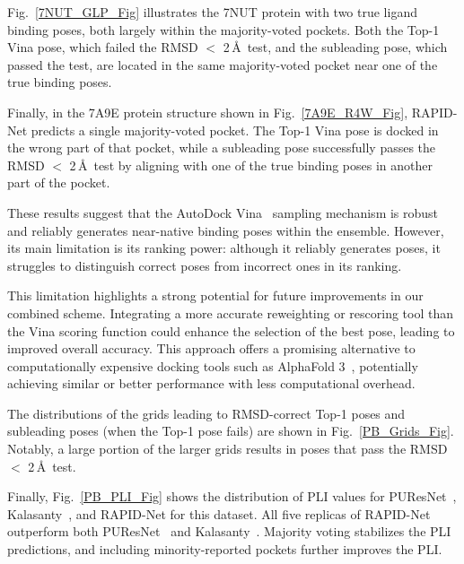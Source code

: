 \documentclass[10pt,conference]{IEEEtran}
\begin{document}
Fig.~\ref{7NUT_GLP_Fig} illustrates the 7NUT protein with two true ligand binding poses, both largely within the majority-voted pockets. Both the Top-1 Vina pose, which failed the RMSD $<$ 2\,\AA\ test, and the subleading pose, which passed the test, are located in the same majority-voted pocket near one of the true binding poses.

Finally, in the 7A9E protein structure shown in Fig.~\ref{7A9E_R4W_Fig}, RAPID-Net predicts a single majority-voted pocket. The Top-1 Vina pose is docked in the wrong part of that pocket, while a subleading pose successfully passes the RMSD $<$ 2\,\AA\ test by aligning with one of the true binding poses in another part of the pocket.

These results suggest that the AutoDock Vina~\cite{eberhardt2021autodock} sampling mechanism is robust and reliably generates near-native binding poses within the ensemble. However, its main limitation is its ranking power: although it reliably generates poses, it struggles to distinguish correct poses from incorrect ones in its ranking. 

This limitation highlights a strong potential for future improvements in our combined scheme. Integrating a more accurate reweighting or rescoring tool than the Vina scoring function could enhance the selection of the best pose, leading to improved overall accuracy. This approach offers a promising alternative to computationally expensive docking tools such as AlphaFold 3~\cite{abramson2024accurate}, potentially achieving similar or better performance with less computational overhead.


The distributions of the grids leading to RMSD-correct Top-1 poses and subleading poses (when the Top-1 pose fails) are shown in Fig.~\ref{PB_Grids_Fig}. Notably, a large portion of the larger grids results in poses that pass the RMSD $<$ 2\,\AA\ test.

Finally, Fig.~\ref{PB_PLI_Fig} shows the distribution of PLI values for PUResNet~\cite{kandel2021puresnet}, Kalasanty~\cite{stepniewska2020improving}, and RAPID-Net for this dataset. All five replicas of RAPID-Net outperform both PUResNet~\cite{kandel2021puresnet} and Kalasanty~\cite{stepniewska2020improving}. Majority voting stabilizes the PLI predictions, and including minority-reported pockets further improves the PLI.
\end{document}
